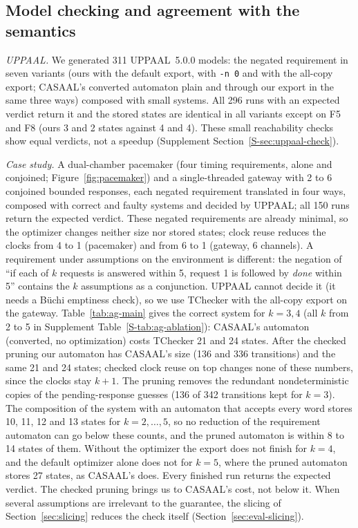 \subsection{Model checking and agreement with the semantics}
\label{sec:verification-adds}
\emph{UPPAAL.} We generated 311 UPPAAL~5.0.0 models: the negated requirement in seven variants (ours with the default export, with \texttt{-n 0} and with the all-copy export; CASAAL's converted automaton plain and through our export in the same three ways) composed with small systems. All 296 runs with an expected verdict return it and the stored states are identical in all variants except on F5 and F8 (ours 3 and 2 states against 4 and 4). These small reachability checks show equal verdicts, not a speedup (Supplement Section~\ref{S-sec:uppaal-check}).

\emph{Case study.} A dual-chamber pacemaker (four timing requirements, alone and conjoined; Figure~\ref{fig:pacemaker}) and a single-threaded gateway with 2 to 6 conjoined bounded responses, each negated requirement translated in four ways, composed with correct and faulty systems and decided by UPPAAL; all 150 runs return the expected verdict. These negated requirements are already minimal, so the optimizer changes neither size nor stored states; clock reuse reduces the clocks from 4 to 1 (pacemaker) and from 6 to 1 (gateway, 6 channels). A requirement under assumptions on the environment is different: the negation of ``if each of $k$ requests is answered within 5, request 1 is followed by \emph{done} within 5'' contains the $k$ assumptions as a conjunction. UPPAAL cannot decide it (it needs a B\"uchi emptiness check), so we use TChecker with the all-copy export on the gateway. Table~\ref{tab:ag-main} gives the correct system for $k=3,4$ (all $k$ from 2 to 5 in Supplement Table~\ref{S-tab:ag-ablation}): CASAAL's automaton (converted, no optimization) costs TChecker 21 and 24 states. After the checked pruning our automaton has CASAAL's size (136 and 336 transitions) and the same 21 and 24 states; checked clock reuse on top changes none of these numbers, since the clocks stay $k+1$. The pruning removes the redundant nondeterministic copies of the pending-response guesses (136 of 342 transitions kept for $k=3$). The composition of the system with an automaton that accepts every word stores 10, 11, 12 and 13 states for $k=2,\dots,5$, so no reduction of the requirement automaton can go below these counts, and the pruned automaton is within 8 to 14 states of them. Without the optimizer the export does not finish for $k=4$, and the default optimizer alone does not for $k=5$, where the pruned automaton stores 27 states, as CASAAL's does. Every finished run returns the expected verdict. The checked pruning brings us to CASAAL's cost, not below it. When several assumptions are irrelevant to the guarantee, the slicing of Section~\ref{sec:slicing} reduces the check itself (Section~\ref{sec:eval-slicing}).

